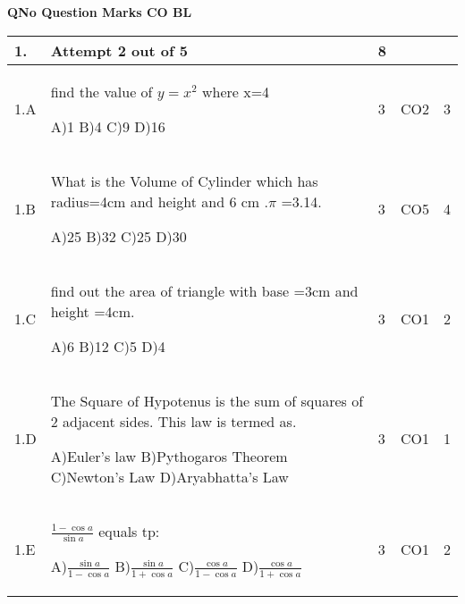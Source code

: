 \documentclass[12pt]{article}
\begin{document}
	\begin{flushleft}
	\bf{QNo}\hspace{1.2cm} \bf{Question} \hspace{5.5cm}  \bf{Marks} \hspace{0.2cm} \bf{CO} \hspace{0.2cm}	\bf{BL}	
	
\end{flushleft} 
	\begin{longtable}{|L{1cm}|L{8cm}|C{1cm}|C{1cm}|C{1cm}|}\hline
		\bf{1}. & \bf{Attempt} \bf2 \bf{out} of \bf5 & \bf8  & & \\ \hline
				1.A & find the value of   $y=x^{2}$  where x=4 \newline
					
		A)1\newline
		B)4\newline
		C)9\newline
		D)16 &
		3 &
		CO2&
		3 \\ \hline
		
				1.B & What is the Volume of Cylinder which has radius=4cm and height and 6 cm .$\pi$ =3.14. \newline
					
		A)25\newline
		B)32\newline
		C)25\newline
		D)30 &
		3 &
		CO5&
		4 \\ \hline
		
				1.C & find out the area of triangle with base =3cm and height =4cm. \newline
					
		A)6\newline
		B)12\newline
		C)5\newline
		D)4 &
		3 &
		CO1&
		2 \\ \hline
		
				1.D & The Square of Hypotenus is the sum of squares of 2 adjacent sides. This law is termed as. \newline
					
		A)Euler's law\newline
		B)Pythogaros  Theorem\newline
		C)Newton's Law\newline
		D)Aryabhatta's Law &
		3 &
		CO1&
		1 \\ \hline
		
				1.E & $\frac{1-\cos a}{\sin a}$  equals tp: \newline
					
		A)$\frac{\sin a}{1-\cos a}$\newline
		B)$\frac{\sin a}{1+\cos a}$\newline
		C)$\frac{\cos a}{1-\cos a}$\newline
		D)$\frac{\cos a}{1+\cos a}$ &
		3 &
		CO1&
		2 \\ \hline
		
		
	\end{longtable}
\end{document}
